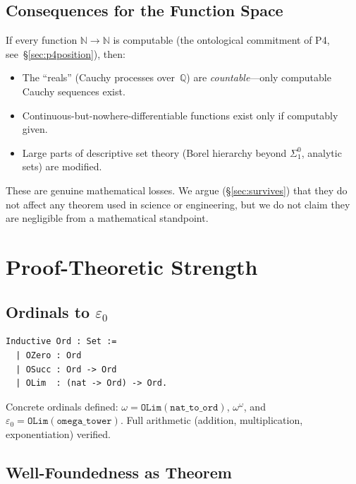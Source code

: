 \documentclass[11pt,a4paper]{article}
\theoremstyle{definition}
\theoremstyle{remark}
\begin{document}
\subsection{Consequences for the Function Space}

If every function $\mathbb{N} \to \mathbb{N}$ is computable (the ontological commitment of P4, see~\S\ref{sec:p4position}), then:
\begin{itemize}[nosep]
\item The ``reals'' (Cauchy processes over~$\mathbb{Q}$) are \emph{countable}---only computable Cauchy sequences exist.
\item Continuous-but-nowhere-differentiable functions exist only if computably given.
\item Large parts of descriptive set theory (Borel hierarchy beyond $\Sigma^0_1$, analytic sets) are modified.
\end{itemize}

These are genuine mathematical losses.  We argue (\S\ref{sec:survives}) that they do not affect any theorem used in science or engineering, but we do not claim they are negligible from a mathematical standpoint.


\section{Proof-Theoretic Strength}
\label{sec:strength}

\subsection{Ordinals to $\varepsilon_0$}

\begin{lstlisting}
Inductive Ord : Set :=
  | OZero : Ord
  | OSucc : Ord -> Ord
  | OLim  : (nat -> Ord) -> Ord.
\end{lstlisting}

Concrete ordinals defined: $\omega = \texttt{OLim}(\texttt{nat\_to\_ord})$, $\omega^\omega$, and $\varepsilon_0 = \texttt{OLim}(\texttt{omega\_tower})$.  Full arithmetic (addition, multiplication, exponentiation) verified.

\subsection{Well-Foundedness as Theorem}
\end{document}
